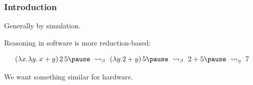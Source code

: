 \begin{frame}
    \frametitle{Introduction}

    Generally by \alert{simulation}.

    \pause

    Reasoning in \alert{software} is more \alert{reduction-based}:

    \[
        (\lambda x.\lambda y.\, x + y) \, 2 \, 5 
        \pause\
        \rightsquigarrow_{\beta}
        \
        (\lambda y. 2 + y) \, 5 
        \pause\
        \rightsquigarrow_{\beta}
        \
        2 + 5 
        \pause\
        \rightsquigarrow_{\eta}
        \
        7
    \]
    
    \pause
    We want something similar for hardware.
\end{frame}